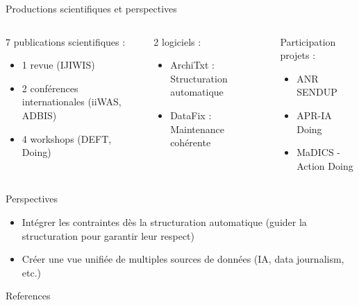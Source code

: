 \documentclass[english,french,table,aspectratio=43]{beamer}
\renewcommand{\_}{\ifincsname_\else\legacyunderscore\fi}
\begin{document}
\begin{frame}{Productions scientifiques et perspectives}
    \begin{columns}
        \begin{column}{.4\linewidth}
            7 publications scientifiques :
            \begin{itemize}
                \item 1 revue (IJIWIS)
                \item 2 conférences internationales (iiWAS, ADBIS)
                \item 4 workshops (DEFT, Doing)
            \end{itemize}
        \end{column}
        \begin{column}{.3\linewidth}
            2 logiciels :
            \begin{itemize}
                \item ArchiTxt : Structuration automatique
                \item DataFix : Maintenance cohérente
            \end{itemize}
        \end{column}
        \begin{column}{.3\linewidth}
            Participation projets :
            \begin{itemize}
                \item ANR SENDUP
                \item APR-IA Doing
                \item MaDICS - Action Doing
            \end{itemize}
        \end{column}
    \end{columns}
    \vfill\pause
    \begin{block}{Perspectives}
        \begin{itemize} 
            \item Intégrer les contraintes dès la structuration automatique (guider la structuration pour garantir leur respect)
            \item Créer une vue unifiée de multiples sources de données (IA, data journalism, etc.)
        \end{itemize}
    \end{block}
\end{frame}

\frame{\titlepage}

\begin{frame}{References}
    
    
\end{frame}
\end{document}
